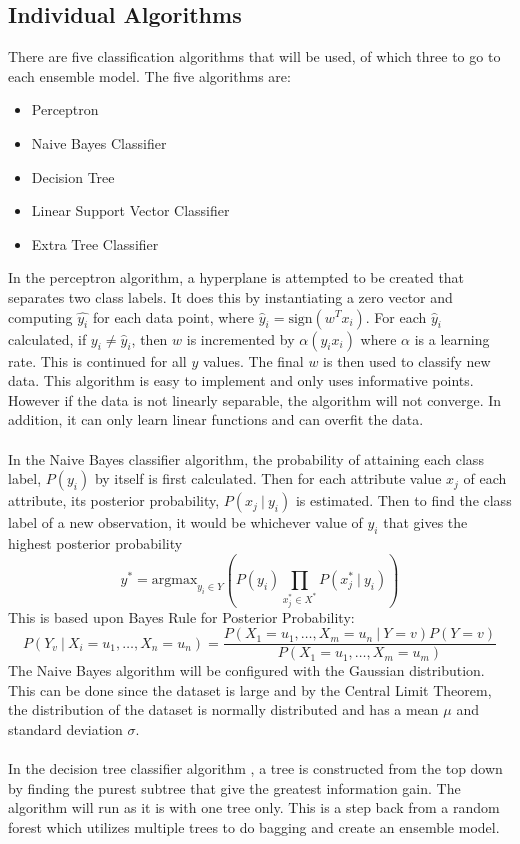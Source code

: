\documentclass{article}
\begin{document}
\subsection{Individual Algorithms} 
There are five classification algorithms that will be used, of which three to go to each ensemble model. The five algorithms are: 
\begin{itemize} \item Perceptron \item Naive Bayes Classifier \item Decision Tree \item Linear Support Vector Classifier \item Extra Tree Classifier \end{itemize} 
In the perceptron algorithm, a hyperplane is attempted to be created that separates two class labels. It does this by instantiating a zero vector and computing $\hat{y_i}$ for each data point, where $\hat{y}_i = \text{sign}(w^Tx_i)$. For each $\hat{y}_i$ calculated, if $y_i \neq \hat{y}_i$, then $w$ is incremented by $\alpha(y_ix_i)$ where $\alpha$ is a learning rate. This is continued for all $y$ values. The final $w$ is then used to classify new data. This algorithm is easy to implement and only uses informative points. However if the data is not linearly separable, the algorithm will not converge. In addition, it can only learn linear functions and can overfit the data. \\~\\
In the Naive Bayes classifier algorithm, the probability of attaining each class label, $P(y_i)$ by itself is first calculated. Then for each attribute value $x_j$ of each attribute, its posterior probability, $P(x_j ~|~ y_i)$ is estimated. Then to find the class label of a new observation, it would be whichever value of $y_i$ that gives the highest posterior probability $$ y^* = \text{argmax}_{y_i \in Y} \left( P(y_i) \prod_{x_j^* \in X^*} P(x_j^* ~|~ y_i) \right) $$ 
This is based upon Bayes Rule for Posterior Probability: 
$$ P(Y_v ~|~ X_i = u_1, \dots, X_n = u_n) = \frac{P(X_1 = u_1,\dots,X_m = u_n ~|~ Y=v)P(Y=v)}{P(X_1=u_1,\dots,X_m=u_m)} $$ 
The Naive Bayes algorithm will be configured with the Gaussian distribution. This can be done since the dataset is large and by the Central Limit Theorem, the distribution of the dataset is normally distributed and has a mean $\mu$ and standard deviation $\sigma$.\\~\\
In the decision tree classifier algorithm , a tree is constructed from the top down by finding the purest subtree that give the greatest information gain. The algorithm will run as it is with one tree only. This is a step back from a random forest which utilizes multiple trees to do bagging and create an ensemble model. \\~\\
\end{document}
